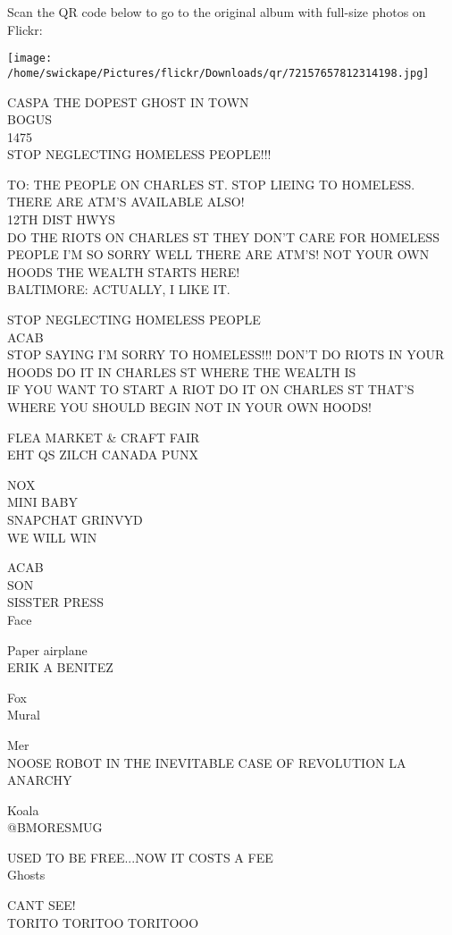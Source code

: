 \documentclass[10pt,letterpaper]{article}
\begin{document}
Scan the QR code below to go to the original album with full-size photos on Flickr:

\texttt{[image: /home/swickape/Pictures/flickr/Downloads/qr/72157657812314198.jpg]}


CASPA THE DOPEST GHOST IN TOWN\\
BOGUS\\
1475\\
STOP NEGLECTING HOMELESS PEOPLE!!!

TO: THE PEOPLE ON CHARLES ST. STOP LIEING TO HOMELESS.  THERE ARE ATM'S AVAILABLE ALSO!\\
12TH DIST HWYS\\
DO THE RIOTS ON CHARLES ST THEY DON'T CARE FOR HOMELESS PEOPLE I'M SO SORRY WELL THERE ARE ATM'S!  NOT YOUR OWN HOODS THE WEALTH STARTS HERE!\\
BALTIMORE: ACTUALLY, I LIKE IT.

STOP NEGLECTING HOMELESS PEOPLE\\
ACAB\\
STOP SAYING I'M SORRY TO HOMELESS!!!  DON'T DO RIOTS IN YOUR HOODS DO IT IN CHARLES ST WHERE THE WEALTH IS\\
IF YOU WANT TO START A RIOT DO IT ON CHARLES ST THAT'S WHERE YOU SHOULD BEGIN NOT IN YOUR OWN HOODS!

FLEA MARKET \& CRAFT FAIR\\
EHT QS ZILCH CANADA PUNX

NOX\\
MINI BABY\\
SNAPCHAT GRINVYD\\
WE WILL WIN

ACAB\\
SON\\
SISSTER PRESS\\
Face

Paper airplane\\
ERIK A BENITEZ

Fox\\
Mural

Mer\\
NOOSE ROBOT IN THE INEVITABLE CASE OF REVOLUTION LA ANARCHY

Koala\\
@BMORESMUG

USED TO BE FREE...NOW IT COSTS A FEE\\
Ghosts

CANT SEE!\\
TORITO TORITOO TORITOOO
\end{document}
